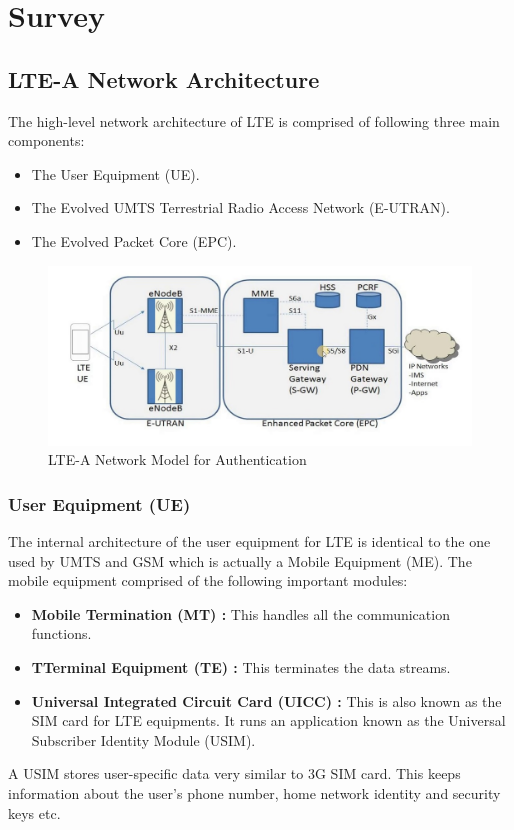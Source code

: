 \chapter{Survey}

\section{LTE-A Network Architecture}
{
    The high-level network architecture of LTE is comprised of following three main components:
    \begin{itemize}
        \item The User Equipment (UE).
        \item The Evolved UMTS Terrestrial Radio Access Network (E-UTRAN).
        \item The Evolved Packet Core (EPC).
    \end{itemize}

    \begin{figure}[ht]
        \centering
        \includegraphics[scale=0.5]{img/LTEA.jpg}
        \caption{LTE-A Network Model for Authentication}
    \end{figure}
}

\subsection{User Equipment (UE)}{
    The internal architecture of the user equipment for LTE is identical 
    to the one used by UMTS and GSM which is actually a Mobile Equipment (ME).
    The mobile equipment comprised of the following important modules:
    \begin{itemize}
        \item \textbf{Mobile Termination (MT) :} This handles all the communication functions.
        \item \textbf{TTerminal Equipment (TE) :} This terminates the data streams.
        \item \textbf{Universal Integrated Circuit Card (UICC) :} This is also known as 
        the SIM card for LTE equipments. It runs an application known as the 
        Universal Subscriber Identity Module (USIM).
    \end{itemize}
    A USIM stores user-specific data very similar to 3G SIM card. This keeps 
    information about the user's phone number, home network identity and security 
    keys etc.
}

